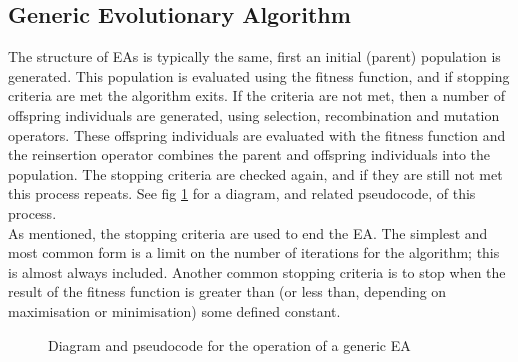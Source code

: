 \subsection{Generic Evolutionary Algorithm}
The structure of EAs is typically the same, first an initial (parent) population is generated. This population is evaluated using the fitness function, and if stopping criteria are met the algorithm exits. If the criteria are not met, then a number of offspring individuals are generated, using selection, recombination and mutation operators. These offspring individuals are evaluated with the fitness function and the reinsertion operator combines the parent and offspring individuals into the population. The stopping criteria are checked again, and if they are still not met this process repeats. See fig \ref{fig:EA} for a diagram\cite{eadiag}, and related pseudocode\cite{eapseudo}, of this process.
\\As mentioned, the stopping criteria are used to end the EA. The simplest and most common form is a limit on the number of iterations for the algorithm; this is almost always included. Another common stopping criteria is to stop when the result of the fitness function is greater than (or less than, depending on maximisation or minimisation) some defined constant. 
\begin{figure}[tp]
   \begin{center}
   \end{center}
   \caption{Diagram and pseudocode for the operation of a generic EA}
   \label{fig:EA}
\end{figure}

